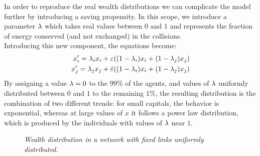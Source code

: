 In order to reproduce the real wealth distributions we can complicate the model further by introducing a saving propensity.
In this scope, we introduce a parameter $\lambda$ which takes real values between $0$ and $1$ and represents the fraction of energy conserved (and not exchanged) in the collisions. \\
Introducing this new component, the equations become:
\begin{equation}
	\begin{split}
		x'_i = \lambda_ix_i + \varepsilon((1-\lambda_i)x_i + (1-\lambda_j)x_j) 	\\
		x'_j = \lambda_jx_j + \bar{\varepsilon}((1-\lambda_i)x_i + (1-\lambda_j)x_j) 	\\
	\end{split}
\end{equation}
By assigning a value $\lambda = 0$ to the $99 \%$ of the agents, and values of $\lambda$ uniformly distributed between $0$ and $1$ to the remaining $1\%$, the resulting distribution is the combination of two different trends: for small capitals, the behavior is exponential, whereas at large values of $x$ it follows a power law distribution, which is produced by the individuals with values of $\lambda$ near $1$.
\begin{figure}[ht!]
    \centering
    \scalebox{.7}{}
    \caption{\emph{Wealth distribution in a network with fixed links uniformly distributed.}}
    \label{fig:savings}
\end{figure}
